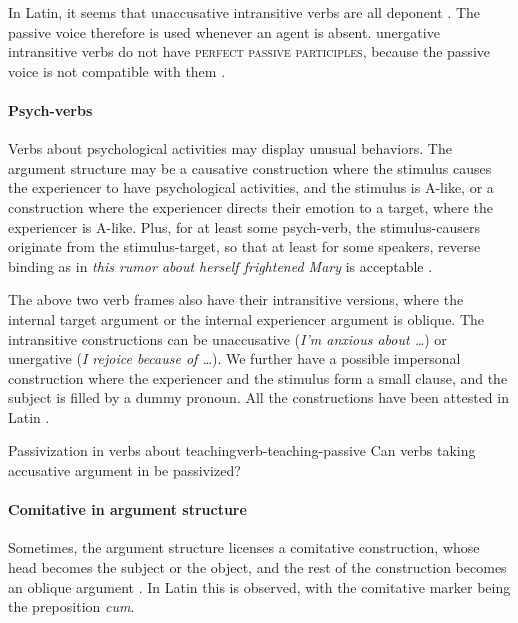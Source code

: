 \documentclass[a4paper, oneside, 12pt]{report}
\newcommand*{\citesec}[1]{\S~{#1}}
\newcommand*{\citepages}[1]{pp.~{#1}}
\newcommand{\form}[1]{\emph{#1}}
\newcommand*{\category}[1]{\textsc{#1}}
\begin{document}
In Latin, it seems that unaccusative intransitive verbs are all deponent
\citep[\citepages{308-309}]{oniga2014latin}.
The passive voice therefore is used whenever an agent is absent.
unergative intransitive verbs do not have \category{perfect passive participles},
because the passive voice is not compatible with them
\citep{giusti2019psychological}.



\paragraph*{Psych-verbs}
Verbs about psychological activities may display unusual behaviors.
The argument structure may be 
a causative construction where the stimulus causes the experiencer to have psychological activities,
and the stimulus is A-like,
or a construction where the experiencer directs their emotion to a target,
where the experiencer is A-like.
Plus, for at least some psych-verb, the stimulus-causers originate from the stimulus-target,
so that at least for some speakers,
reverse binding as in \form{this rumor about herself frightened Mary} is acceptable
\citep{hornstein2002psych}.

The above two verb frames also have their intransitive versions,
where the internal target argument or the internal experiencer argument is oblique.
The intransitive constructions can be unaccusative (\form{I'm anxious about \dots})
or unergative (\form{I rejoice because of \dots}).
We further have a possible impersonal construction where the experiencer and the stimulus
form a small clause,
and the subject is filled by a dummy pronoun.
All the constructions have been attested in Latin \citep{giusti2019psychological}.

\begin{todobox}{Passivization in verbs about teaching}{verb-teaching-passive}
    Can verbs taking accusative argument in \citep[\citesec{4.36}]{Pinkster1}
    be passivized?
\end{todobox}

\paragraph*{Comitative in argument structure}
Sometimes, the argument structure licenses a comitative construction,
whose head becomes the subject or the object,
and the rest of the construction becomes an oblique argument \citep{zhang2007syntax}.
In Latin this is observed, with the comitative marker being the preposition \form{cum}.
\end{document}
